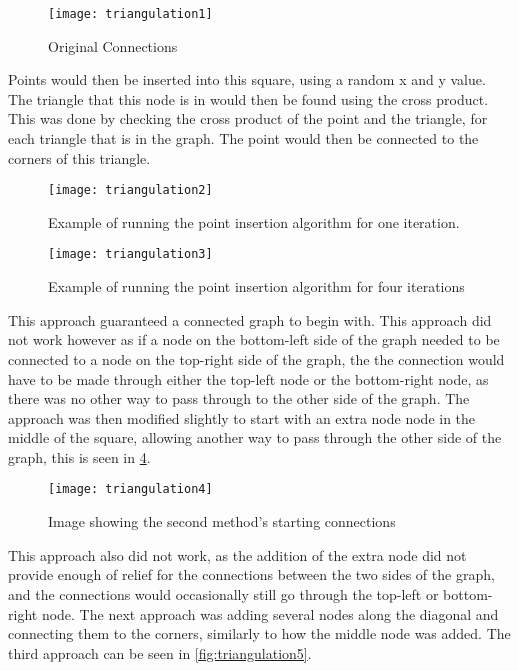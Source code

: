 \begin{figure}[H]
	\texttt{[image: triangulation1]}
	\centering
	\caption{Original Connections}
	\label{fig:triangulation1}
\end{figure}

	Points would then be inserted into this square, using a random x and y value.  The triangle that this node is in would then be found using the cross product. This was done by checking the cross product of the point and the triangle, for each triangle that is in the graph. The point would then be connected to the corners of this triangle.\\

\begin{figure}[H]
	\texttt{[image: triangulation2]}
	\centering
	\caption{Example of running the point insertion algorithm for one iteration.}
	\label{fig:triangulation2}
\end{figure}

\begin{figure}[H]
	\texttt{[image: triangulation3]}
	\centering
	\caption{Example of running the point insertion algorithm for four iterations}
	\label{fig:triangulation3}
\end{figure}

	This approach guaranteed a connected graph to begin with. This approach did not work however as if a node on the bottom-left side of the graph needed to be connected to a node on the top-right side of the graph, the the connection would have to be made through either the top-left node or the bottom-right node, as there was no other way to pass through to the other side of the graph. The approach was then modified slightly to start with an extra node node in the middle of the square, allowing another way to pass through the other side of the graph, this is seen in \ref{fig:triangulation4}.

\begin{figure}[H]
	\texttt{[image: triangulation4]}
	\centering
	\caption{Image showing the second method's starting connections}
	\label{fig:triangulation4}
\end{figure}
	
	This approach also did not work, as the addition of the extra node did not provide enough of relief for the connections between the two sides of the graph, and the connections would occasionally still go through the top-left or bottom-right node.
The next approach was adding several nodes along the diagonal and connecting them to the corners, similarly to how the middle node was added. The third approach can be seen in \ref{fig:triangulation5}.


